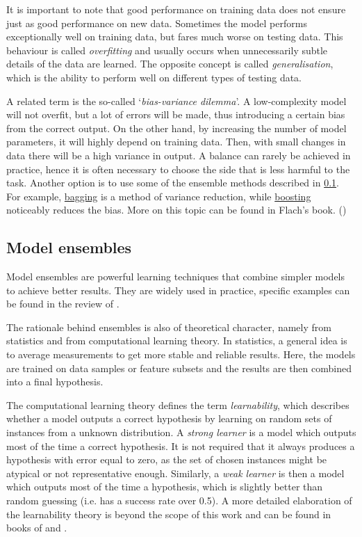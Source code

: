 It is important to note that good performance on training data does not ensure 
just as good performance on new data. Sometimes the model performs 
exceptionally well on training data, but fares much worse on testing data. 
This behaviour is called \emph{overfitting} and usually occurs when 
unnecessarily subtle details of the data are learned. The opposite concept 
is called \emph{generalisation}, which is the ability to perform well on 
different types of testing data.

A related term is the so-called `\emph{bias-variance dilemma}'. A 
low-complexity model will not overfit, but a lot of errors will be made, thus 
introducing a certain bias from the correct output. On the other hand, by 
increasing the number of model parameters, it will highly depend on training 
data. Then, with small changes in data there will be a high variance in 
output. A balance can rarely be achieved in practice, hence it is often 
necessary to choose the side that is less harmful to the task. Another option
is to use some of the ensemble methods described in \ref{ensemble}. For
example, \hyperref[bagging]{bagging} is a method of variance reduction, while
\hyperref[boosting]{boosting} noticeably reduces the bias. More on this topic
can be found in Flach's book. (\citet[p.~93--94,~338]{Flach:2012:MLA:2490546})

\subsection{Model ensembles} \label{ensemble}
Model ensembles are powerful learning techniques that combine simpler models 
to achieve better results. They are widely used in practice, specific examples
can be found in the review of \cite{Rokach:2009:TCE:1609202.1609436}.

The rationale behind ensembles is also of theoretical character, namely from
statistics and from computational learning theory. In statistics, a general
idea is to average measurements to get more stable and reliable results.
Here, the models are trained on data samples or feature subsets and the results
are then combined into a final hypothesis.

The computational learning theory defines the term \emph{learnability},
which describes whether a model outputs a correct hypothesis by learning on
random sets of instances from a unknown distribution. A \emph{strong learner}
is a model which outputs most of the time a correct hypothesis. It is not
required that it always produces a hypothesis with error equal to zero, as 
the set of chosen instances might be atypical or not representative enough.
Similarly, a \emph{weak learner} is then a model which outputs most of the time
a hypothesis, which is slightly better than random guessing (i.e. has a
success rate over 0.5). A more detailed elaboration of the learnability
theory is beyond the scope of this work and can be found in books 
of \citep{Flach:2012:MLA:2490546} and \citep{Mitchell:1997:ML:541177}.

